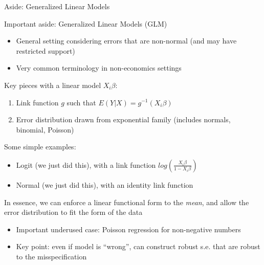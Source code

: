 \documentclass[notes,11pt, aspectratio=169]{beamer}
\newenvironment{wideitemize}{\itemize\addtolength{\itemsep}{10pt}}{\enditemize}
\begin{document}
\begin{frame}{Aside: Generalized Linear Models}
  \begin{wideitemize}
    \item  Important aside: Generalized Linear Models (GLM)
      \begin{itemize}
      \item General setting considering errors that are non-normal
        (and may have restricted support)
      \item Very common terminology in non-economics settings
      \end{itemize}
    \item Key pieces with a linear model $X_{i}\beta$:
      \begin{enumerate}
      \item Link function $g$  such that $E(Y|X) = g^{-1}(X_{i}\beta)$
      \item Error distribution drawn from exponential family (includes normals, binomial, Poisson)
      \end{enumerate}
    \item Some simple examples:
      \begin{itemize}
      \item Logit (we just did this), with a link function $log\left(\frac{X_{i}\beta}{1-X_{i}\beta}\right)$
      \item Normal (we just did this), with an identity link function
      \end{itemize}
    \item In essence, we can enforce a linear functional form to the
      \emph{mean}, and allow the error distribution to fit the form of
      the data
      \begin{itemize}
      \item Important underused case: Poisson regression for
        non-negative numbers
      \item Key point: even if model is ``wrong'', can construct
        robust s.e. that are robust to the misspecification
      \end{itemize}
  \end{wideitemize}
  \end{frame}
\end{document}
